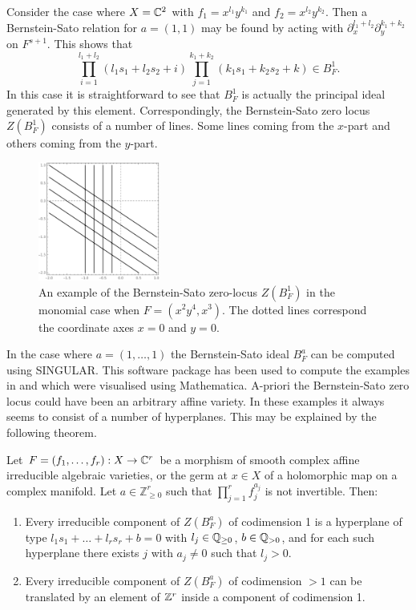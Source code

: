 \begin{example}
  Consider the case where $X=\mathbb{C}^2$ with $f_1 = x^{l_1}y^{k_1}$ and $f_2 = x^{l_2}y^{k_2}$.
  Then a Bernstein-Sato relation for $a = (1,1)$ may be found by acting with $\partial_x^{l_1 + l_2}\partial_y^{k_1 + k_2}$ on $F^{s+1}$.
  This shows that
  $$\prod_{i=1}^{l_1 + l_2}(l_1 s_1 + l_2 s_2 + i) \prod_{j=1}^{k_1 + k_2}  (k_1s_1 + k_2 s_2 + k) \in B_F^{1}.$$
  In this case it is straightforward to see that $B_F^{1}$ is actually the principal ideal generated by this element.
  Correspondingly, the Bernstein-Sato zero locus $Z(B_F^1)$ consists of a number of lines.
  Some lines coming from the $x$-part and others coming from the $y$-part.
  \begin{figure}[h!]
    \centering
    \includegraphics[width =4cm ]{Figures/MonomialBS2}
    \caption{An example of the Bernstein-Sato zero-locus $Z(B_F^1)$ in the monomial case when $F = (x^2y^4, x^3)$. The dotted lines correspond the coordinate axes $x=0$ and $y=0$.}
  \end{figure}
  \end{example}
    In the case where $a =(1,\ldots,1)$ the Bernstein-Sato ideal $B_F^a$ can be computed using SINGULAR.
    This software package has been used to compute the examples in  and  which were visualised using Mathematica.
    A-priori the Bernstein-Sato zero locus could have been an arbitrary affine variety.
    In these examples it always seems to consist of a number of hyperplanes.
    This may be explained by the following theorem.
    \begin{theorem}{\cite[Theorem 1.1.1]{budur2020zeroII}} \label{thrmMoreA}
      Let $F=(f_1,\ldots,f_r):X\rightarrow\mathbb{C}^r$ be a morphism of smooth complex affine irreducible algebraic varieties, or the germ at $x\in X$ of a holomorphic map on a complex manifold.  Let $a\in\mathbb{Z}_{\geq 0}^r$ such that $\prod_{j=1}^rf_j^{a_j}$ is not invertible. Then:
    \begin{enumerate}
    \item Every irreducible component of $Z(B_F^{a})$ of codimension 1 is a  hyperplane of type $l_1s_1+\ldots+l_rs_r+b=0$ with $l_j\in\mathbb{Q}_{\ge 0}$, $b\in\mathbb{Q}_{>0}$, and for each such hyperplane there exists $j$ with $a_j\ne 0$ such that $l_j>0$.
    \item Every irreducible component of  $Z(B_F^{a})$ of codimension $>1$  can be translated by an element of $\mathbb{Z}^r$ inside a component of codimension 1.
    \end{enumerate}
    \end{theorem}
